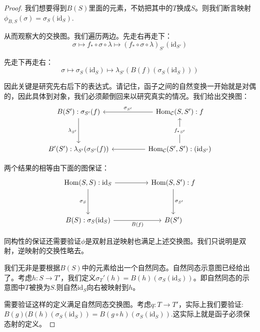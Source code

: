 \begin{proof}
        我们想要得到$B(S)$里面的元素，不妨把其中的$T$换成$S$。则我们断言映射$\phi_{B,S}(\sigma)=\sigma_S(\text{id}_S)$.

        从而观察大的交换图。我们遍历两边。先走右再走下：
        $$
        \sigma \mapsto f_* \circ \sigma \circ \lambda \mapsto  (f_* \circ \sigma \circ \lambda)_{S'}(\text{id}_{S'})
        $$

        先走下再走右：
        $$
        \sigma \mapsto \sigma_S(\text{id}_S) \mapsto \lambda_{S'}(B(f)(\sigma_S(\text{id}_S)))
        $$
        
        因此关键是研究先右后下的表达式。请记住，函子之间的自然变换一开始就是对偶的，因此具体到对象，我们必须颠倒回来以研究真实的情况。我们给出交换图：
        \[
            \centering
            \begin{tikzcd}
                {B(S'):\sigma_{S'}(f)} && {\text{Hom}_{\mathcal{C}}(S,S'):f} \\
                \\
                {B'(S'):\lambda_{S'}(\sigma_{S'}(f))} && {\text{Hom}_{\mathcal{C}}(S',S'):(\text{id}_{S'})}
                \arrow[from=3-3, to=3-1]
                \arrow["{\lambda_{S'}}"', from=1-1, to=3-1]
                \arrow["{\sigma_{S'}}"', from=1-3, to=1-1]
                \arrow["{{f_*}_{S'}}"{description}, from=3-3, to=1-3]
            \end{tikzcd}
        \]
        
        两个结果的相等由下面的图保证：
        \[
            \centering
            \begin{tikzcd}
                {\text{Hom}(S,S):\text{id}_S} && {\text{Hom}(S,S'):f} \\
                \\
                {B(S):\sigma_S(\text{id}_S)} && {B(S')}
                \arrow["{\sigma_S}"', from=1-1, to=3-1]
                \arrow["{B(f)}"', from=3-1, to=3-3]
                \arrow[from=1-1, to=1-3]
                \arrow["{\sigma_{S'}}", from=1-3, to=3-3]
            \end{tikzcd}
        \]

        同构性的保证还需要验证$\phi$是双射且逆映射也满足上述交换图。我们只说明是双射，逆映射的交换性略去。

        我们无非是要根据$B(S)$中的元素给出一个自然同态。自然同态示意图已经给出了。考虑$h:S \to T'$，我们定义$\sigma_T'(h)=B(h)(\sigma_S(\text{id}_S))$。即自然同态的示意图中$T$被换为$S$.则自然$\text{id}_S$向右被映射到$h$。

        需要验证这样的定义满足自然同态交换图。考虑$q:T \to T'$，实际上我们要验证:$B(g)(B(h)(\sigma_S(\text{id}_S))=B(g \circ h)(\sigma_S(\text{id}_S))$.这实际上就是函子必须保态射的定义。


\end{proof}
